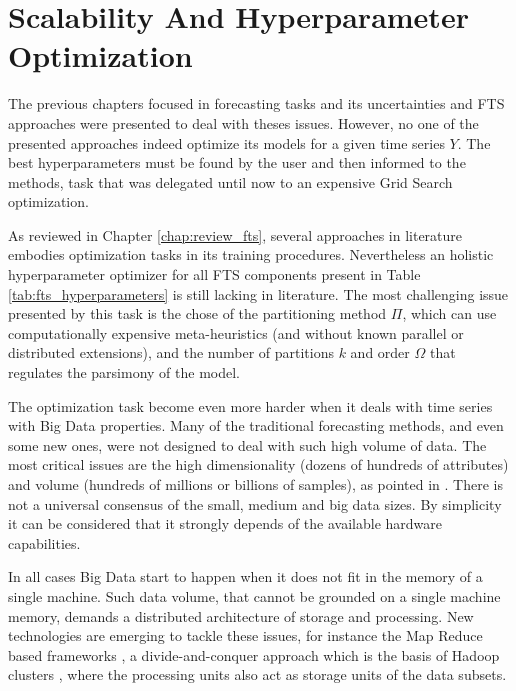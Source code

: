 \chapter{Scalability And Hyperparameter Optimization}
\label{chap:scalability}


The previous chapters focused in forecasting tasks and its uncertainties and FTS approaches were presented to deal with theses issues. However, no one of the presented approaches indeed optimize its models for a given time series $Y$. The best hyperparameters must be found by the user and then informed to the methods, task that was delegated until now to an expensive Grid Search optimization.

As reviewed in Chapter \ref{chap:review_fts}, several approaches in literature embodies optimization tasks in its training procedures. Nevertheless an holistic hyperparameter optimizer for all FTS components present in Table \ref{tab:fts_hyperparameters} is still lacking in literature. The most challenging issue presented by this task is the chose of the partitioning method $\Pi$, which can use computationally expensive meta-heuristics (and without known parallel or distributed extensions), and the number of partitions $k$ and order $\Omega$ that regulates the parsimony of the model.

The optimization task become even more harder when it deals with time series with Big Data properties. Many of the traditional forecasting methods, and even some new ones, were not designed to deal with such high volume of data. The most critical issues are the high dimensionality (dozens of hundreds of attributes) and volume (hundreds of millions or billions of samples), as pointed in \cite{Qiu2016}. There is not a universal consensus of the small, medium and big data sizes. By simplicity it can be considered that it strongly depends of the available hardware capabilities. 

In all cases Big Data start to happen when it does not fit in the memory of a single machine. Such data volume, that cannot be grounded on a single machine memory, demands a distributed architecture of storage and processing. New technologies are emerging to tackle these issues, for instance the Map Reduce based frameworks \cite{Dean2008}, a  divide-and-conquer approach which is the basis of Hadoop clusters \cite{White2012}, where the processing units also act as storage units of the data subsets. 

